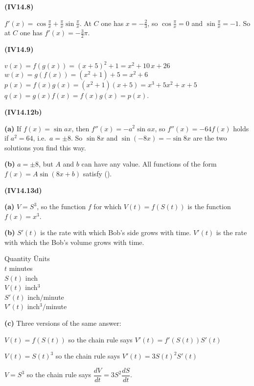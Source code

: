 \documentclass[openany,reqno]{amsbook}
\begin{document}
\begin{trivlist}
\item[{\bf(IV14.8)}]

  $f'(x) = \cos\frac\pi x + \frac\pi x \sin\frac\pi x$.
  At $C$ one has $x=-\frac23$, so $\cos\frac\pi x = 0$ and
  $\sin\frac\pi x = -1$.  So at $C$ one has $f'(x) = -\frac32\pi$.
  \bigskip

\item[{\bf(IV14.9)}]

  $v(x) = f(g(x)) = (x+5)^2+1 = x^2+10\,x+26$ \\
  $w(x)=g(f(x)) = (x^2+1)+5 = x^2+6$\\
  $p(x)= f(x)g(x) = (x^2+1)(x+5) = x^3+5x^2+x+5$\\
  $q(x) = g(x)f(x) = f(x)g(x) = p(x)$.
  \bigskip

\item[{\bf(IV14.12b)}]

  \textbf{(a)} If $f(x) = \sin ax$, then $f''(x) = -a^2 \sin ax$, so
  $f''(x) = -64f(x)$ holds if $a^2 = 64$, i.e.~$a=\pm 8$.  So $\sin 8x
  $ and $\sin(-8x) = -\sin 8x$ are the two solutions you find this
  way.

  \textbf{(b)} $a=\pm8$, but $A$ and $b$ can have any value.  All
  functions of the form $f(x) =  A \sin(8x+b)$ satisfy (\dag).
  \bigskip

\item[{\bf(IV14.13d)}]

  \textbf{(a)} $V=S^3$, so the function $f$ for which $V(t)=f(S(t))$
  is the function $f(x) = x^3$.

  \textbf{(b)} $S'(t)$ is the rate with which Bob's side grows with
  time.  $V'(t)$ is the rate with which the Bob's volume grows with
  time.
  \begin{tabbing}
    Quantity \hspace{2ex}\= Units \\
    $t$ \> minutes\\
    $S(t)$ \> inch \\
    $V(t)$ \> inch$^3$ \\
    $S'(t)$ \> inch$/$minute \\
    $V'(t)$ \> inch$^3/$minute
  \end{tabbing}

  \textbf{(c)} Three versions of the same answer:

  $V(t) = f(S(t))$ so the chain rule says $V'(t) = f'(S(t)) S'(t)$

  $V(t) = S(t)^3$ so the chain rule says $V'(t) = 3S(t)^2 S'(t)$

  $V=S^3$ so the chain rule says $\dfrac{dV}{dt} =
  3S^2\dfrac{dS}{dt}$.


\end{trivlist}
\end{document}
